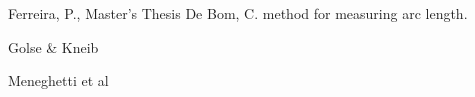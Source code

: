 
\begin{thebibliography}{99}

 Ferreira, P., Master's Thesis
 De Bom, C. method for measuring arc length.

 Golse \& Kneib

 Meneghetti et al


\end{thebibliography}


